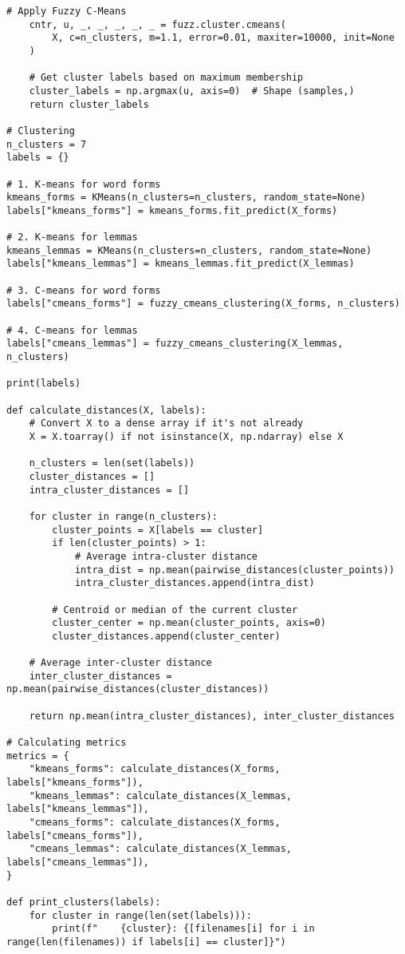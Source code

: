 \begin{lstlisting}[label=lst:1,caption= Сравнение алгоритмов кластеризации K-Means и K-Medoids]
	# Apply Fuzzy C-Means
	cntr, u, _, _, _, _, _ = fuzz.cluster.cmeans(
		X, c=n_clusters, m=1.1, error=0.01, maxiter=10000, init=None
	)
	
	# Get cluster labels based on maximum membership
	cluster_labels = np.argmax(u, axis=0)  # Shape (samples,)
	return cluster_labels

# Clustering
n_clusters = 7
labels = {}

# 1. K-means for word forms
kmeans_forms = KMeans(n_clusters=n_clusters, random_state=None)
labels["kmeans_forms"] = kmeans_forms.fit_predict(X_forms)

# 2. K-means for lemmas
kmeans_lemmas = KMeans(n_clusters=n_clusters, random_state=None)
labels["kmeans_lemmas"] = kmeans_lemmas.fit_predict(X_lemmas)

# 3. C-means for word forms
labels["cmeans_forms"] = fuzzy_cmeans_clustering(X_forms, n_clusters)

# 4. C-means for lemmas
labels["cmeans_lemmas"] = fuzzy_cmeans_clustering(X_lemmas, n_clusters)

print(labels)

def calculate_distances(X, labels):
	# Convert X to a dense array if it's not already
	X = X.toarray() if not isinstance(X, np.ndarray) else X
	
	n_clusters = len(set(labels))
	cluster_distances = []
	intra_cluster_distances = []
	
	for cluster in range(n_clusters):
		cluster_points = X[labels == cluster]
		if len(cluster_points) > 1:
			# Average intra-cluster distance
			intra_dist = np.mean(pairwise_distances(cluster_points))
			intra_cluster_distances.append(intra_dist)
		
		# Centroid or median of the current cluster
		cluster_center = np.mean(cluster_points, axis=0)
		cluster_distances.append(cluster_center)
	
	# Average inter-cluster distance
	inter_cluster_distances = np.mean(pairwise_distances(cluster_distances))
	
	return np.mean(intra_cluster_distances), inter_cluster_distances

# Calculating metrics
metrics = {
	"kmeans_forms": calculate_distances(X_forms, labels["kmeans_forms"]),
	"kmeans_lemmas": calculate_distances(X_lemmas, labels["kmeans_lemmas"]),
	"cmeans_forms": calculate_distances(X_forms, labels["cmeans_forms"]),
	"cmeans_lemmas": calculate_distances(X_lemmas, labels["cmeans_lemmas"]),
}

def print_clusters(labels):
	for cluster in range(len(set(labels))):
		print(f"    {cluster}: {[filenames[i] for i in range(len(filenames)) if labels[i] == cluster]}")


\end{lstlisting}
